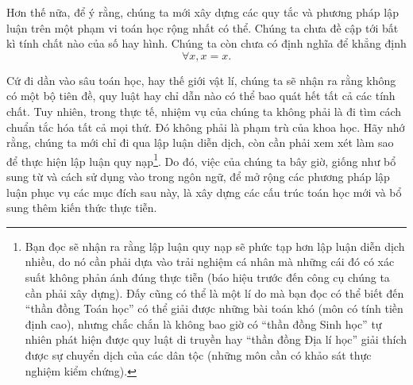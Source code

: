 Hơn thế nữa, để ý rằng, chúng ta mới xây dựng các quy tắc và phương pháp lập luận trên một phạm vi toán học rộng nhất có thể. Chúng ta chưa đề cập tới bất kì tính chất nào của số hay hình. Chúng ta còn chưa có định nghĩa để khẳng định $$\forall x, x = x.$$

Cứ đi dần vào sâu toán học, hay thế giới vật lí, chúng ta sẽ nhận ra rằng không có một bộ tiên đề, quy luật hay chỉ dẫn nào có thể bao quát hết tất cả các tính chất. Tuy nhiên, trong thực tế, nhiệm vụ của chúng ta không phải là đi tìm cách chuẩn tắc hóa tất cả mọi thứ. Đó không phải là phạm trù của khoa học. Hãy nhớ rằng, chúng ta mới chỉ đi qua lập luận diễn dịch, còn cần phải xem xét làm sao để thực hiện lập luận quy nạp\footnote{Bạn đọc sẽ nhận ra rằng lập luận quy nạp sẽ phức tạp hơn lập luận diễn dịch nhiều, do nó cần phải dựa vào trải nghiệm cá nhân mà những cái đó có xác suất không phản ánh đúng thực tiễn (báo hiệu trước đến công cụ chúng ta cần phải xây dựng). Đấy cũng có thể là một lí do mà bạn đọc có thể biết đến ``thần đồng Toán học'' có thể giải được những bài toán khó (môn có tính tiền định cao), nhưng chắc chắn là không bao giờ có ``thần đồng Sinh học'' tự nhiên phát hiện được quy luật di truyền hay ``thần đồng Địa lí học'' giải thích được sự chuyển dịch của các dân tộc (những môn cần có khảo sát thực nghiệm kiểm chứng).}. Do đó, việc của chúng ta bây giờ, giống như bổ sung từ và cách sử dụng vào trong ngôn ngữ, để mở rộng các phương pháp lập luận phục vụ các mục đích sau này, là xây dựng các cấu trúc toán học mới và bổ sung thêm kiến thức thực tiễn.